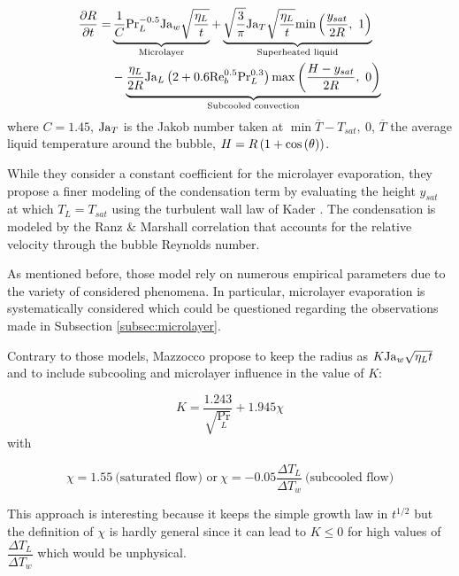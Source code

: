 \begin{align}
\nonumber \dtime{R} = &\underbrace{ \frac{1}{C} \Pr_{L}^{-0.5}\Ja_{w} \sqrt{\dfrac{\eta_{L}}{t}} }_{\text{Microlayer}} + \underbrace{\sqrt{\dfrac{3}{\pi}}\Ja_{T} \sqrt{\dfrac{\eta_{L}}{t}}\min{\dfrac{y_{sat}}{2R},\ 1}}_{\text{Superheated liquid}}\\ 
%
& - \underbrace{\frac{\eta_{L}}{2R}\Ja_{L}\parth{2+0.6\Re_{b}^{0.5}\Pr_{L}^{0.3}}\max{\frac{H-y_{sat}}{2R},\ 0}}_{\text{Subcooled convection}}
\end{align}
where $C=1.45$, $\mathrm{Ja}_{T}$ is the Jakob number taken at $\min{\overline{T}-T_{sat},\ 0}$, $\overline{T}$ the average liquid temperature around the bubble, $H=R\left( 1+\mathrm{cos}\left( \theta \right) \right)$.

\npar

While they consider a constant coefficient for the microlayer evaporation, they propose a finer modeling of the condensation term by evaluating the height $y_{sat}$ at which $T_{L}=T_{sat}$ using the turbulent wall law of Kader \cite{kader_heat_1972}. The condensation is modeled by the Ranz \& Marshall correlation \cite{ranz_evaporation_1952} that accounts for the relative velocity through the bubble Reynolds number.


\begin{remark*}{}
As mentioned before, those model rely on numerous empirical parameters due to the variety of considered phenomena. In particular, microlayer evaporation is systematically considered which could be questioned regarding the observations made in Subsection \ref{subsec:microlayer}.
\end{remark*}

\npar

Contrary to those models, Mazzocco \etal \cite{mazzocco_reassessed_2018} propose to keep the radius as $K\mathrm{Ja}_{w}\sqrt{\eta_{L}t}$ and to include subcooling and microlayer influence in the value of $K$:

\begin{equation}
K = \frac{1.243}{\sqrt{\Pr_{L}}} + 1.945 \chi
\label{eq:Kgrowth_mazzocco}
\end{equation}
with

\begin{equation}
\chi = 1.55\ \text{(saturated flow) or}\ \chi = -0.05 \frac{\Delta T_{L}}{\Delta T_{w}}\ \text{(subcooled flow)}
\end{equation}

\begin{remark*}{}
This approach is interesting because it keeps the simple growth law in $t^{1/2}$ but the definition of $\chi$ is hardly general since it can lead to $K\leq 0$ for high values of $\dfrac{\Delta T_{L}}{\Delta T_{w}}$ which would be unphysical.
\end{remark*}


